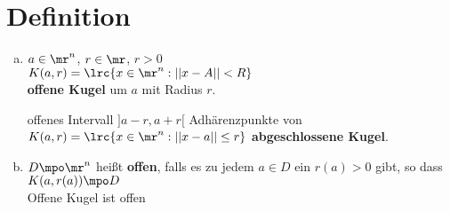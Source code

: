 \section{Definition}
	\begin{enumerate}[a)]
		\item $ a\in\mr^n $, $ r\in\mr $, $ r>0 $\\
		$ K(a,r)=\lrc{x\in\mr^n:||x-A||<R} $\\
		\textbf{offene Kugel} um $ a $ mit Radius $ r $.
		
		
		offenes Intervall $ ]a-r,a+r[ $
		Adhärenzpunkte von $ K(a,r)=\lrc{x\in\mr^n:||x-a||\leq r} $ \textbf{abgeschlossene Kugel}.
		
		\item  $ D\mpo\mr^n $ heißt \textbf{offen}, falls es zu jedem $ a\in D $ ein $ r(a)>0 $ gibt, so dass $ K(a,r(a))\mpo D $\\
		Offene Kugel ist offen
	\end{enumerate}

